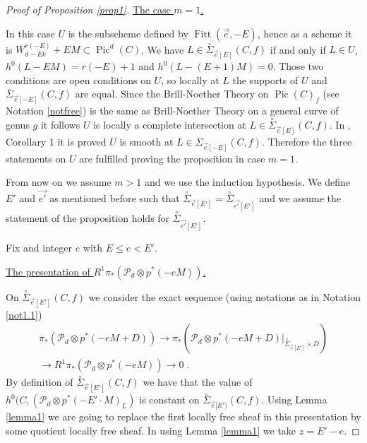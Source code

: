 \documentclass{article}
\DeclareMathOperator{\Pic}{Pic}
\DeclareMathOperator{\Fitt}{Fitt}
\theoremstyle{definition}
\theoremstyle{remark}
\begin{document}
\begin{proof}[Proof of Proposition \ref{prop1}]
\underline{The case $m=1$.}

In this case $U$ is the subscheme defined by $\Fitt (\overrightarrow{e},-E)$, hence as a scheme it is $W^{r(-E)}_{d-Ek}+EM \subset \Pic ^d(C)$.
We have $L \in \overset {\circ}{\Sigma}_{\overrightarrow {e}[E]}(C,f)$ if and only if $L \in U$, $h^0(L-EM)=r(-E)+1$ and $h^0(L-(E+1)M)=0$.
Those two conditions are open conditions on $U$, so locally at $L$ the supports of $U$ and $\overline{\Sigma}_{\overrightarrow {e}[-E]}(C,f)$ are equal.
Since the Brill-Noether Theory on $\Pic(C)_f$ (see Notation \ref{notfree}) is the same as Brill-Noether Theory on a general curve of genus $g$ it follows $U$ is locally a complete intersection at $L \in \overset {\circ}{\Sigma}_{\overrightarrow {e}[E]}(C,f)$.
In \cite{ref2}, Corollary 1 it is proved $U$ is smooth at $L \in \Sigma_{\overrightarrow {e}[-E]}(C,f)$.
Therefore the three statements on $U$ are fulfilled proving the proposition in case $m=1$.

From now on we assume $m>1$ and we use the induction hypothesis.
We define $E'$ and $\overrightarrow {e'}$ as mentioned before such that $\overset {\circ}{\Sigma}_{\overrightarrow {e}[E']}=\overset {\circ}{\Sigma}_{\overrightarrow {e'}[E']}$ and we assume the statement of the proposition holds for $\overset {\circ}{\Sigma}_{\overrightarrow {e'}[E']}$.

Fix and integer $e$ with $E \leq e <E'$.

\underline{The presentation of $R^1\pi_*(\mathcal{P}_d \otimes p^*(-eM))$.}

On $\overset {\circ}{\Sigma}_{\overrightarrow {e}[E']}(C,f)$ we consider the exact sequence (using notations as in Notation \ref{not1.1})
\begin{multline*}
\pi_* (\mathcal{P}_d \otimes p^*(-eM+D)) \rightarrow \pi_* (\mathcal{P}_d \otimes p^* (-eM+D)\vert _{\overset {\circ}{\Sigma}_{\overrightarrow {e}[E']} \times D})\\
 \rightarrow R^1\pi_* (\mathcal {P}_d \otimes p^*(-eM)) \rightarrow 0 \text { .}
\end{multline*}
By definition of $\overset {\circ}{\Sigma}_{\overrightarrow {e}[E']}(C,f)$ we have that the value of $h^0(C,(\mathcal {P}_d \otimes p^*(-E'\cdot M)_L)$ is constant on $\overset {\circ}{\Sigma}_{\overrightarrow {e}[E')}(C,f)$.
Using Lemma \ref{lemma1} we are going to replace the first locally free sheaf in this presentation by some quotient locally free sheaf.
In using Lemma \ref{lemma1} we take $z=E'-e$.


\end{proof}
\end{document}
